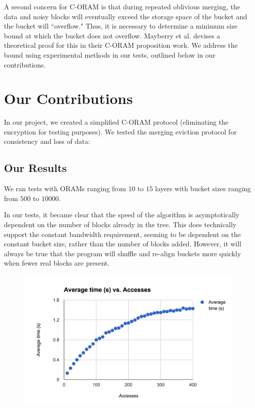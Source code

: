 \documentclass[12pt, oneside]{article}   	%
\begin{document}
A second concern for C-ORAM is that during repeated oblivious merging, the data and noisy blocks will eventually exceed the storage space of the bucket and the bucket will ``overflow." Thus, it is necessary to determine a minimum size bound at which the bucket does not overflow. Mayberry et al. devises a theoretical proof for this in their C-ORAM proposition work. We address the bound using experimental methods in our tests, outlined below in our contributions.




\section{Our Contributions}

In our project, we created a simplified C-ORAM protocol (eliminating the encryption for testing purposes). We tested the merging eviction protocol for consistency and loss of data:

\subsection{Our Results}

We ran tests with ORAMs ranging from $10$ to $15$ layers with bucket sizes ranging from $500$ to $10000$.

In our tests, it became clear that the speed of the algorithm is asymptotically dependent on the number of blocks already in the tree. This does technically support the constant bandwidth requirement, seeming to be dependent on the constant bucket size, rather than the number of blocks added. However, it will always be true that the program will shuffle and re-align buckets more quickly when fewer real blocks are present.

\begin{figure}[h!]
  \includegraphics[width=\linewidth]{runtimegraph}
  \caption{}
  \label{fig:runtimegraph}
\end{figure}
\end{document}
